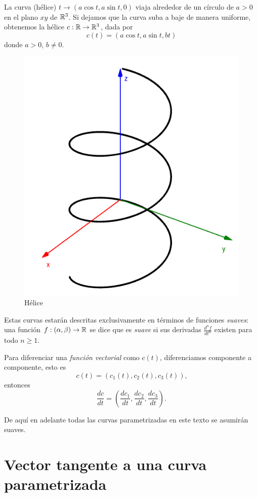 \begin{example}
    La curva (hélice) $t \rightarrow (a\cos{t},a\sin{t},0)$ viaja alrededor de un círculo de 
    $a > 0$ en el plano $xy$ de $\mathbb{R}^{3}$. Si dejamos que la curva suba a baje de manera
    uniforme, obtenemos la hélice $c:\mathbb{R} \rightarrow \mathbb{R}^{3}$, dada por
    $$ c(t) = (a\cos{t}, a\sin{t}, bt) $$
    donde $a>0$, $b \ne 0$.
\end{example}

\begin{figure}[!ht]
  \begin{center}
      \includegraphics[width=0.6\linewidth]{gfx/helice}
      \caption{Hélice}
      \label{fig:boat1}
  \end{center}
\end{figure}

Estas curvas estar\'an descritas exclusivamente en t\'erminos de funciones \emph{suaves}: una funci\'on
$f:(\alpha,\beta) \rightarrow \mathbb{R}$ se dice que es \emph{suave} si sus derivadas $\frac{d^{n}f}{dt^{n}}$
existen para todo $n \ge 1$.

Para diferenciar una \emph{funci\'on vectorial} como $c(t)$, diferenciamos componente a componente, esto es
$$ c(t) = (c_{1}(t),c_{2}(t),c_{3}(t))\text{,}$$
entonces
$$ \frac{dc}{dt} = \left( \frac{dc_{1}}{dt},\frac{dc_{2}}{dt},\frac{dc_{3}}{dt}\right)\text{.}$$

De aqu\'i en adelante todas las curvas parametrizadas en este texto se asumir\'an suaves.

\section{Vector tangente a una curva parametrizada}

